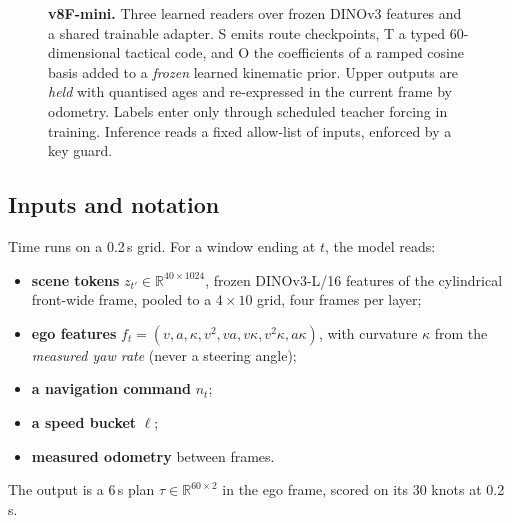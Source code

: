 \documentclass[10pt,twocolumn]{article}
\theoremstyle{remark}
\newcommand{\Rset}{\mathbb{R}}
\begin{document}
\begin{figure}[t]
{}
\caption{\textbf{v8F-mini.} Three learned readers over frozen DINOv3 features and a shared trainable adapter. S emits route checkpoints,
T a typed 60-dimensional tactical code, and O the coefficients of a ramped cosine basis added to a \emph{frozen} learned kinematic
prior. Upper outputs are \emph{held} with quantised ages and re-expressed in the current frame by odometry. Labels enter only through
scheduled teacher forcing in training. Inference reads a fixed allow-list of inputs, enforced by a key guard.}
\label{fig:v8f}
\end{figure}

\subsection{Inputs and notation}
Time runs on a 0.2\,s grid. For a window ending at $t$, the model reads:
\begin{itemize}
  \item \textbf{scene tokens} $z_{t'}\in\Rset^{40\times1024}$, frozen DINOv3-L/16 features of the cylindrical front-wide frame, pooled to a
        $4\times10$ grid, four frames per layer;
  \item \textbf{ego features} $f_t=(v,a,\kappa,v^2,va,v\kappa,v^2\kappa,a\kappa)$, with curvature $\kappa$ from the \emph{measured yaw rate}
        (never a steering angle);
  \item \textbf{a navigation command} $n_t$;
  \item \textbf{a speed bucket} $\ell$;
  \item \textbf{measured odometry} between frames.
\end{itemize}
The output is a 6\,s plan $\tau\in\Rset^{60\times2}$ in the ego frame, scored on its 30 knots at 0.2\,s.
\end{document}
